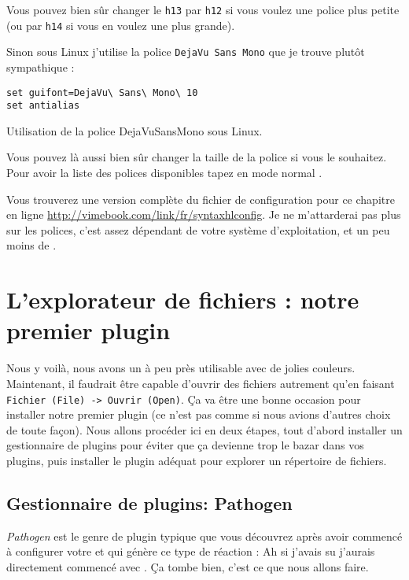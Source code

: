 Vous pouvez bien sûr changer le \Verb|h13| par \Verb|h12| si vous voulez une police plus petite (ou par \Verb|h14| si vous en voulez une plus grande).

Sinon sous Linux j'utilise la police \Verb|DejaVu Sans Mono| que je trouve plutôt sympathique :

\begin{listing}[H]
\begin{verbatim}
set guifont=DejaVu\ Sans\ Mono\ 10
set antialias
\end{verbatim}
  \caption{Utilisation de la police DejaVuSansMono sous Linux.}
  \label{lst:dejavusansmono}
\end{listing}

Vous pouvez là aussi bien sûr changer la taille de la police si vous le souhaitez. Pour avoir la liste des polices disponibles tapez en mode normal .

Vous trouverez une version complète du fichier de configuration pour ce chapitre en ligne \url{http://vimebook.com/link/fr/syntaxhlconfig}. Je ne m'attarderai pas plus sur les polices, c'est assez dépendant de votre système d'exploitation, et un peu moins de \vim.


\section{L'explorateur de fichiers : notre premier plugin}

Nous y voilà, nous avons un \vim à peu près utilisable avec de jolies couleurs. Maintenant, il faudrait être capable d'ouvrir des fichiers autrement qu'en faisant \Verb|Fichier (File) -> Ouvrir (Open)|. Ça va être une bonne occasion pour installer notre premier plugin (ce n'est pas comme si nous avions d'autres choix de toute façon). Nous allons procéder ici en deux étapes, tout d'abord installer un gestionnaire de plugins pour éviter que ça devienne trop le bazar dans vos plugins, puis installer le plugin adéquat pour explorer un répertoire de fichiers.

\subsection{Gestionnaire de plugins: Pathogen}

\emph{Pathogen} est le genre de plugin typique que vous découvrez après avoir commencé à configurer votre \vim et qui génère ce type de réaction : \og Ah si j'avais su j'aurais directement commencé avec \fg. Ça tombe bien, c'est ce que nous allons faire.


